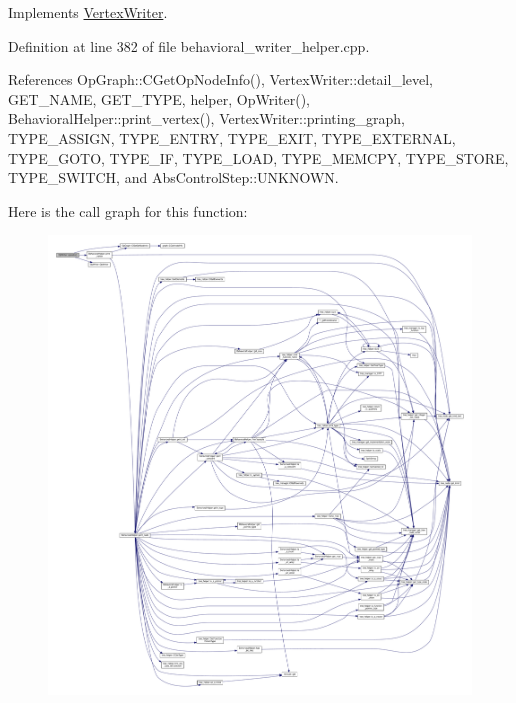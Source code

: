 Implements \hyperlink{classVertexWriter_a9df92a65d6e59d160be56eb8ec5cb84c}{Vertex\+Writer}.



Definition at line 382 of file behavioral\+\_\+writer\+\_\+helper.\+cpp.



References Op\+Graph\+::\+C\+Get\+Op\+Node\+Info(), Vertex\+Writer\+::detail\+\_\+level, G\+E\+T\+\_\+\+N\+A\+ME, G\+E\+T\+\_\+\+T\+Y\+PE, helper, Op\+Writer(), Behavioral\+Helper\+::print\+\_\+vertex(), Vertex\+Writer\+::printing\+\_\+graph, T\+Y\+P\+E\+\_\+\+A\+S\+S\+I\+GN, T\+Y\+P\+E\+\_\+\+E\+N\+T\+RY, T\+Y\+P\+E\+\_\+\+E\+X\+IT, T\+Y\+P\+E\+\_\+\+E\+X\+T\+E\+R\+N\+AL, T\+Y\+P\+E\+\_\+\+G\+O\+TO, T\+Y\+P\+E\+\_\+\+IF, T\+Y\+P\+E\+\_\+\+L\+O\+AD, T\+Y\+P\+E\+\_\+\+M\+E\+M\+C\+PY, T\+Y\+P\+E\+\_\+\+S\+T\+O\+RE, T\+Y\+P\+E\+\_\+\+S\+W\+I\+T\+CH, and Abs\+Control\+Step\+::\+U\+N\+K\+N\+O\+WN.

Here is the call graph for this function\+:
\nopagebreak
\begin{figure}[H]
\begin{center}
\leavevmode
\includegraphics[width=350pt]{db/d95/classOpWriter_a58cae1db8599d723605d387a61c0c967_cgraph}
\end{center}
\end{figure}


